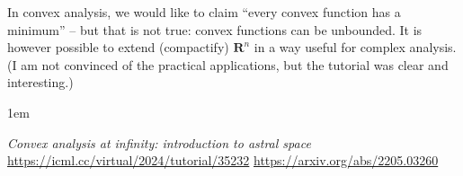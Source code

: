 \documentclass[a5paper]{article}
\def\RR{\mathbf{R}}
\newenvironment{reference}{%
  \medskip\goodbreak
  \parskip 0pt
  \raggedright
  \leftskip 1em
  \obeylines
}{\par\medskip\goodbreak}
\begin{document}
In convex analysis, we would like to claim
``every convex function has a minimum'' -- but that is not true:
convex functions can be unbounded.
It is however possible to extend (compactify) $\RR^n$ in a way useful for complex analysis.
(I am not convinced of the practical applications, but the tutorial was clear
and interesting.)

\begin{reference}
  \emph{Convex analysis at infinity: introduction to astral space}
  \url{https://icml.cc/virtual/2024/tutorial/35232}
  \url{https://arxiv.org/abs/2205.03260}
\end{reference}
\end{document}
